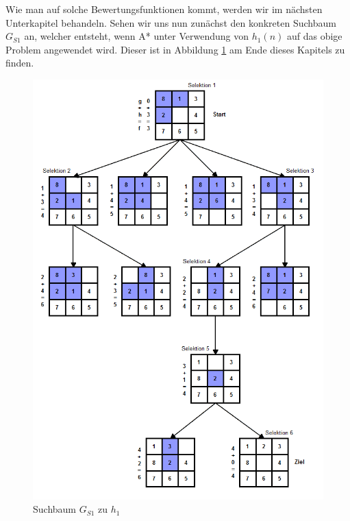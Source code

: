 Wie man auf solche Bewertungsfunktionen kommt, werden wir im nächsten Unterkapitel behandeln. Sehen wir uns nun zunächst den konkreten Suchbaum  $G_{S1}$ an, welcher entsteht, wenn A* unter Verwendung von $h_{1}(n)$ auf das obige Problem angewendet wird.
Dieser ist in Abbildung \ref{fig:figure1} am Ende dieses Kapitels zu finden.

\begin{figure}[p]
	\includegraphics[width=14cm]{chapters/informed_search/tree1.png}
	\caption{Suchbaum $G_{S1}$ zu $h_{1}$}
	\label{fig:figure1}
\end{figure}

